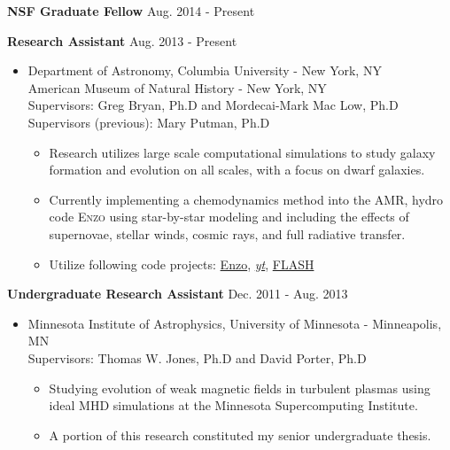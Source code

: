 \documentclass[10pt]{article}
\newenvironment{innerlist}[1][\enskip\textbullet]%
        {\begin{itemize}[#1,leftmargin=*,parsep=0pt,itemsep=0pt,topsep=0pt,partopsep=0pt]}
        {\end{itemize}}
\begin{document}
\textbf{NSF Graduate Fellow} \hfill {Aug. 2014 - Present}

\textbf{Research Assistant} \hfill {Aug. 2013 - Present}
\begin{innerlist}

\item[] Department of Astronomy, Columbia University - New York, NY\\
        American Museum of Natural History - New York, NY\\
    Supervisors: Greg Bryan, Ph.D and Mordecai-Mark Mac Low, Ph.D\\
		Supervisors (previous): Mary Putman, Ph.D
		\begin{innerlist}
		\item Research utilizes large scale computational simulations to study
		galaxy formation and evolution on all scales, with a focus on dwarf galaxies.
		\item Currently implementing a chemodynamics method into the AMR, hydro code 
		\textsc{Enzo} using star-by-star modeling and including the effects of supernovae,
		stellar winds, cosmic rays, and full radiative transfer.
		\item Utilize following code projects: \href{http://enzo-project.org/}{Enzo}, 
		\href{http://yt-project.org/}{\textit{yt}}, \href{http://flash.uchicago.edu/site/}{FLASH}
		\end{innerlist}
\end{innerlist}

\iflong
\textbf{Undergraduate Research Assistant} \hfill {Dec. 2011 - Aug. 2013}
\begin{innerlist}

\item[] Minnesota Institute of Astrophysics, University of Minnesota - Minneapolis, MN\\
		Supervisors: Thomas W. Jones, Ph.D and David Porter, Ph.D
		\iflong
		\begin{innerlist}
		\item Studying evolution of weak magnetic fields in turbulent plasmas using
		ideal MHD simulations at the Minnesota Supercomputing Institute.
		\item A portion of this research constituted my senior undergraduate thesis.
		\end{innerlist}
		\fi
\end{innerlist}
\end{document}
